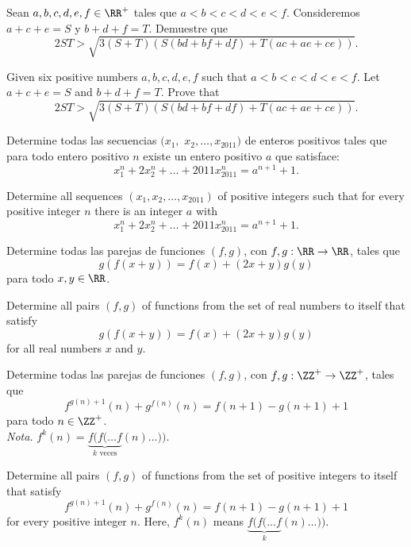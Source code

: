 \begin{probMR}[ISL 2010/A8]
  Sean $a,b,c,d,e,f\in\RR^+$ tales que $a<b<c<d<e<f$. Consideremos $a+c+e=S$ y
  $b+d+f=T$. Demuestre que
  \[2ST>\sqrt{3(S+T)\left(S(bd+bf+df)+T(ac+ae+ce)\right)}.\]
  \begin{hint}
    Given six positive numbers $a,b,c,d,e,f$ such that $a<b<c<d<e<f$. Let
    $a+c+e=S$ and $b+d+f=T$. Prove that
    \[2ST>\sqrt{3(S+T)\left(S(bd+bf+df)+T(ac+ae+ce)\right)}.\]
  \end{hint}
\end{probMR}

\begin{probEG}[ISL 2011/A2]
  Determine todas las secuencias $(x_1,$ $x_2,\dots,x_{2011})$ de enteros
  positivos tales que para todo entero positivo $n$ existe un entero positivo
  $a$ que satisface:
  \[x_1^n+2x_2^n+\dots+2011x_{2011}^n=a^{n+1}+1.\]
  \begin{hint}
    Determine all sequences $(x_1,x_2,\dots,x_{2011})$ of positive integers such
    that for every positive integer $n$ there is an integer $a$ with
    \[x_1^n+2x_2^n+\dots+2011x_{2011}^n=a^{n+1}+1.\]
  \end{hint}
\end{probEG}

\begin{probMG}[ISL 2011/A3]
  Determine todas las parejas de funciones $(f,g)$, con $f,g:\RR\to\RR$, tales
  que
  \[g(f(x+y))=f(x)+(2x+y)g(y)\]
  para todo $x,y\in\RR$.
  \begin{hint}
    Determine all pairs $(f,g)$ of functions from the set of real numbers to
    itself that satisfy
    \[g(f(x+y))=f(x)+(2x+y)g(y)\]
    for all real numbers $x$ and $y$.
  \end{hint}
\end{probMG}

\begin{problem}[ISL 2011/A4]
  Determine todas las parejas de funciones $(f,g)$, con $f,g:\ZZ^+\to\ZZ^+$,
  tales que
  \[f^{g(n)+1}(n)+g^{f(n)}(n)=f(n+1)-g(n+1)+1\]
  para todo $n\in\ZZ^+$.\\[4pt]
  \emph{Nota.} $f^k(n)=\underbrace{f(f(\dots f}_{k\text{ veces}}(n)\dots))$.
  \begin{hint}
    Determine all pairs $(f,g)$ of functions from the set of positive integers
    to itself that satisfy
    \[f^{g(n)+1}(n)+g^{f(n)}(n)=f(n+1)-g(n+1)+1\]
    for every positive integer $n$. Here, $f^k(n)$ means
    $\underbrace{f(f(\dots f}_k(n)\dots))$.
  \end{hint}
\end{problem}

